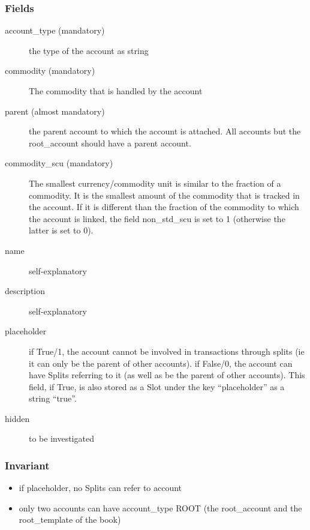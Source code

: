 \documentclass[letterpaper,10pt,english]{sphinxmanual}
\begin{document}
\subsubsection{Fields}
\label{object_model:id4}\begin{description}
\item[{account\_type (mandatory)}] \leavevmode
the type of the account as string

\item[{commodity (mandatory)}] \leavevmode
The commodity that is handled by the account

\item[{parent (almost mandatory)}] \leavevmode
the parent account to which the account is attached. All accounts but the root\_account should have a parent account.

\item[{commodity\_scu (mandatory)}] \leavevmode
The smallest currency/commodity unit is similar to the fraction of a commodity. It is the smallest amount of the commodity
that is tracked in the account. If it is different than the fraction of the commodity to which the account is linked,
the field non\_std\_scu is set to 1 (otherwise the latter is set to 0).

\item[{name}] \leavevmode
self-explanatory

\item[{description}] \leavevmode
self-explanatory

\item[{placeholder}] \leavevmode
if True/1, the account cannot be involved in transactions through splits (ie it can only be the parent of other accounts).
if False/0, the account can have Splits referring to it (as well as be the parent of other accounts).
This field, if True, is also stored as a Slot under the key ``placeholder'' as a string ``true''.

\item[{hidden}] \leavevmode
to be investigated

\end{description}


\subsubsection{Invariant}
\label{object_model:id5}\begin{itemize}
\item {} 
if placeholder, no Splits can refer to account

\item {} 
only two accounts can have account\_type ROOT (the root\_account and the root\_template of the book)

\end{itemize}
\end{document}
